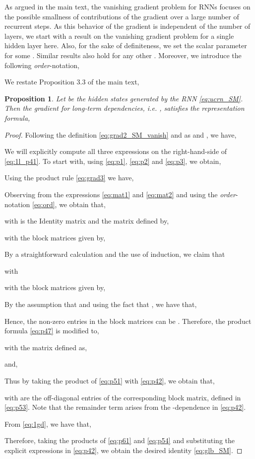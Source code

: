 \documentclass[a4paper]{article}
\newtheorem{proposition}[theorem]{Proposition}
\begin{document}
As argued in the main text, the vanishing gradient problem for RNNs focuses on the possible smallness of contributions of the gradient over a large number of recurrent steps. As this behavior of the gradient is independent of the number of layers, we start with a result on the vanishing gradient problem for a single hidden layer here. Also, for the sake of definiteness, we set the scalar parameter  for some . Similar results also hold for any other . Moreover, we introduce the following \emph{order}-notation,



We restate Proposition 3.3 of the main text,
\begin{proposition}
\label{prop:4_SM}
Let  be the hidden states generated by the RNN \eqref{eq:ucrn_SM}. Then the gradient for long-term dependencies, i.e. , satisfies the representation formula,

\end{proposition}
\begin{proof}
Following the definition \eqref{eq:grad2_SM_vanish} and as  and , we have,

We will explicitly compute all three expressions on the right-hand-side of \eqref{eq:1l_p41}. To start with, using \eqref{eq:p1}, \eqref{eq:p2} and \eqref{eq:p3}, we obtain,

Using the product rule \eqref{eq:grad3} we have,

Observing from the expressions \eqref{eq:mat1} and \eqref{eq:mat2} and using the \emph{order}-notation \eqref{eq:ord}, we obtain that,

with  is the  Identity matrix and the matrix  defined by,

with the block matrices  given by,

By a straightforward calculation and the use of induction, we claim that 

with 

with the block matrices  given by,

By the assumption that  and using the fact that , we have that,

Hence, the non-zero entries in the block matrices can be . Therefore, the product formula \eqref{eq:p47} is modified to,

    with the  matrix  defined as,
    
and,

Thus by taking the product of \eqref{eq:p51} with \eqref{eq:p42}, we obtain that,

with  are the off-diagonal entries of the corresponding block matrix, defined in \eqref{eq:p53}. Note that the  remainder term arises from the -dependence in \eqref{eq:p42}.  

From \eqref{eq:1gd}, we have that,

 Therefore, taking the products of \eqref{eq:p61} and \eqref{eq:p54} and substituting the explicit expressions in \eqref{eq:p42}, we obtain the desired identity \eqref{eq:glb_SM}. 
 \end{proof}
\end{document}
